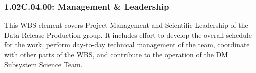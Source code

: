 \subsubsection{1.02C.04.00: Management \& Leadership}

This WBS element covers Project Management and Scientific Leadership of
the Data Release Production group. It includes effort to develop the
overall schedule for the work, perform day-to-day technical management
of the team, coordinate with other parts of the WBS, and contribute to
the operation of the DM Subsystem Science Team.
